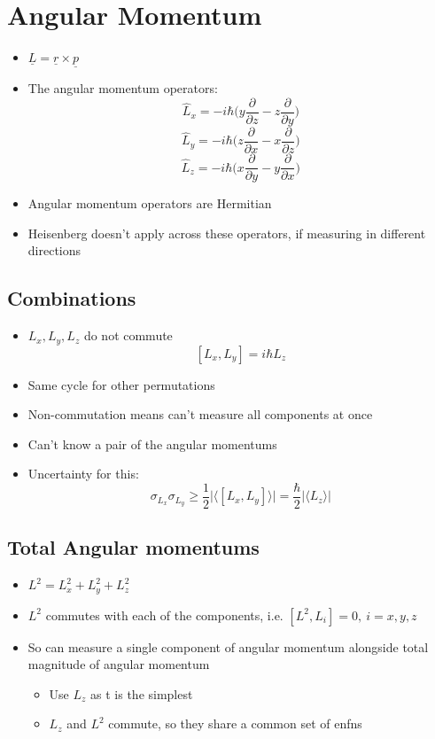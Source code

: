 \documentclass[a4paper,11pt,normalem]{article}
\begin{document}
\section{Angular Momentum}\label{angular-momentum}

\begin{itemize}
\item
  \(\underline{L} = \underline{r} \times \underline{p}\)
\item
  The angular momentum operators: \[
  \hat{L}_x = -i\hbar \Big(y\frac{\partial}{\partial z} - z\frac{\partial}{\partial y} \Big)
  \] \[
  \hat{L}_y = -i\hbar \Big(z\frac{\partial}{\partial x} - x\frac{\partial}{\partial z} \Big)
  \] \[
  \hat{L}_z = -i\hbar \Big(x\frac{\partial}{\partial y} - y\frac{\partial}{\partial x} \Big)
  \]
\item
  Angular momentum operators are Hermitian
\item
  Heisenberg doesn't apply across these operators, if measuring in
  different directions
\end{itemize}

\subsection{Combinations}
\begin{itemize}
\item
  \(L_x, L_y, L_z\) do not commute \[
  [L_x, L_y] = i\hbar L_z
  \]
\item
  Same cycle for other permutations
\item
  Non-commutation means can't measure all components at once
\item
  Can't know a pair of the angular momentums
\item
  Uncertainty for this: \[
  \sigma_{L_x}\sigma_{L_y} \geq \frac{1}{2}\Bigg| \Big\langle[L_x, L_y]\Big\rangle\Bigg| = \frac{\hbar}{2}\Bigg|\Big\langle L_z \Big \rangle \Bigg|
  \]
\end{itemize}

\subsection{Total Angular momentums}
\begin{itemize}
\item
  \(L^2 = L_{x}^2 + L_{y}^2 + L_{z}^2\)
\item
  \(L^2\) commutes with each of the components, i.e.
  \([L^2, L_{i}] = 0, ~i = x,y,z\)
\item
  So can measure a single component of angular momentum alongside total
  magnitude of angular momentum
  \begin{itemize}
  \item
    Use \(L_z\) as t is the simplest
  \item
    \(L_z\) and \(L^2\) commute, so they share a common set of enfns
  \end{itemize}
\end{itemize}
\end{document}
